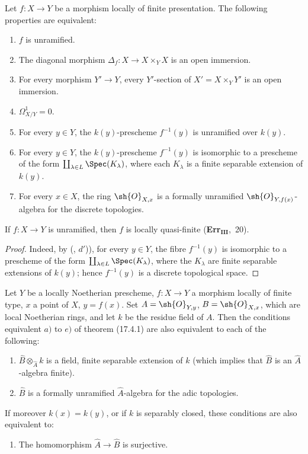 \begin{corollary}[17.4.2]
\label{IV.17.4.2}
Let $f:X\to Y$ be a morphism locally of finite presentation.
The following properties are equivalent:
\begin{enumerate}[label=(\alph*)]
  \item $f$ is unramified.
  \item The diagonal morphism $\Delta_f:X\to X\times_Y X$ is an open immersion.
  \item[b')] For every morphism $Y'\to Y$, every $Y'$-section of $X'=X\times_Y Y'$ is an open immersion.
  \item $\Omega^1_{X/Y}=0$.
  \item For every $y\in Y$, the $k(y)$-prescheme $f^{-1}(y)$ is unramified over $k(y)$.
  \item[d')] For every $y\in Y$, the $k(y)$-prescheme $f^{-1}(y)$ is isomorphic to a prescheme of the form $\coprod_{\lambda\in L}\Spec(K_\lambda)$, where each $K_\lambda$ is a finite separable extension of $k(y)$.
  \item For every $x\in X$, the ring $\sh{O}_{X,x}$ is a formally unramified $\sh{O}_{Y,f(x)}$-algebra for the discrete topologies.
\end{enumerate}
\end{corollary}

\begin{corollary}[17.4.3]
\label{IV.17.4.3}
If $f:X\to Y$ is unramified, then $f$ is locally quasi-finite (\textbf{Err}$_\textbf{III}$,~20).
\end{corollary}

\begin{proof}
Indeed, by (, $d'$)), for every $y\in Y$, the fibre $f^{-1}(y)$ is isomorphic to a prescheme of the form $\coprod_{\lambda\in L}\Spec(K_\lambda)$, where the $K_\lambda$ are finite separable extensions of $k(y)$; hence $f^{-1}(y)$ is a discrete topological space.
\end{proof}

\begin{proposition}[17.4.4]
\label{IV.17.4.4}
Let $Y$ be a locally Noetherian prescheme, $f:X\to Y$ a morphism locally of finite type, $x$ a point of $X$, $y=f(x)$.
Set $A=\sh{O}_{Y,y}$, $B=\sh{O}_{X,x}$, which are local Noetherian rings, and let $k$ be the residue field of $A$.
Then the conditions equivalent $a)$ to $e)$ of theorem (17.4.1) are also equivalent to each of the following:
\begin{enumerate}
  \item[f)] $\hat{B}\otimes_{\hat{A}}k$ is a field, finite separable extension of $k$ (which implies that $\hat{B}$ is an $\hat{A}$-algebra finite).
  \item[f')] $\hat{B}$ is a formally unramified $\hat{A}$-algebra for the adic topologies.
\end{enumerate}
If moreover $k(x)=k(y)$, or if $k$ is separably closed, these conditions are also equivalent to:
\begin{enumerate}
  \item[f'')] The homomorphism $\hat{A}\to\hat{B}$ is surjective.
\end{enumerate}
\end{proposition}

